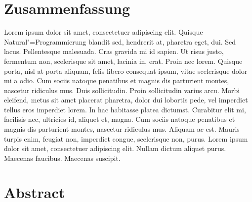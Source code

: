 \section*{Zusammenfassung}
\label{sec:Zusammenfassung}
Lorem ipsum dolor sit amet, consectetuer adipiscing elit. Quisque Natural"=Programmierung blandit sed, hendrerit at, pharetra eget, dui. Sed lacus. Pellentesque malesuada. Cras gravida mi id sapien. Ut risus justo, fermentum non, scelerisque sit amet, lacinia in, erat. Proin nec lorem. Quisque porta, nisl at porta aliquam, felis libero consequat ipsum, vitae scelerisque dolor mi a odio. Cum sociis natoque penatibus et magnis dis parturient montes, nascetur ridiculus mus. Duis sollicitudin. Proin sollicitudin varius arcu. Morbi eleifend, metus sit amet placerat pharetra, dolor dui lobortis pede, vel imperdiet tellus eros imperdiet lorem. In hac habitasse platea dictumst. Curabitur elit mi, facilisis nec, ultricies id, aliquet et, magna. Cum sociis natoque penatibus et magnis dis parturient montes, nascetur ridiculus mus. Aliquam ac est. Mauris turpis enim, feugiat non, imperdiet congue, scelerisque non, purus. Lorem ipsum dolor sit amet, consectetuer adipiscing elit. Nullam dictum aliquet purus. Maecenas faucibus. Maecenas suscipit.


\section*{Abstract}
\label{sec:Abstract}


